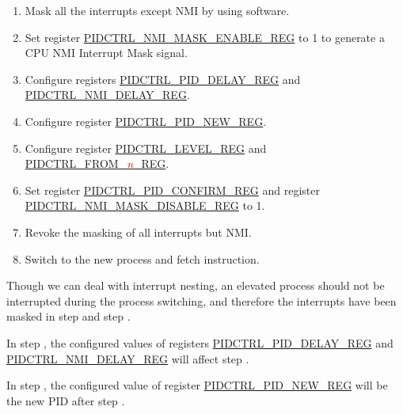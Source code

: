 \documentclass[main\_\_EN.tex]{subfiles}
\begin{document}
\begin{enumerate}
    \item Mask all the interrupts except NMI by using software.
        \setcounter{STEP_MASK_NON_NMI}{\theenumi}
    \item Set register \hyperref[regdesc:PIDCTRLNMIMASKENABLEREG]{PIDCTRL\_NMI\_MASK\_ENABLE\_REG} to 1 to generate a CPU NMI Interrupt Mask signal.
        \setcounter{STEP_MASK_NMI}{\theenumi}
    \item Configure registers \hyperref[regdesc:PIDCTRLPIDDELAYREG]{PIDCTRL\_PID\_DELAY\_REG} and \hyperref[regdesc:PIDCTRLNMIDELAYREG]{PIDCTRL\_NMI\_DELAY\_REG}.
        \setcounter{STEP_SET_DELAY}{\theenumi}
    \item Configure register \hyperref[regdesc:PIDCTRLPIDNEWREG]{PIDCTRL\_PID\_NEW\_REG}.
        \setcounter{STEP_SET_PID_NEW}{\theenumi}
    \item Configure register \hyperref[regdesc:PIDCTRLLEVELREG]{PIDCTRL\_LEVEL\_REG} and \hyperref[regdesc:PIDCTRLFROMnREG]{PIDCTRL\_FROM\_\textcolor{red}{\it{n}}\_REG}.
        \setcounter{STEP_RESTORE}{\theenumi}
    \item Set register \hyperref[regdesc:PIDCTRLPIDCONFIRMREG]{PIDCTRL\_PID\_CONFIRM\_REG} and register \hyperref[regdesc:PIDCTRLNMIMASKDISABLEREG]{PIDCTRL\_NMI\_MASK\_DISABLE\_REG} to 1.
        \setcounter{STEP_CHANGE}{\theenumi}
    \item Revoke the masking of all interrupts but NMI.
        \setcounter{STEP_RELEASE_NON_NMI}{\theenumi}
    \item Switch to the new process and fetch instruction.
        \setcounter{STEP_JUMP}{\theenumi}
\end{enumerate}

Though we can deal with interrupt nesting,
an elevated process should not be interrupted during the process switching, and therefore the interrupts have been masked in step  and step .

In step , the configured values of registers \hyperref[regdesc:PIDCTRLPIDDELAYREG]{PIDCTRL\_PID\_DELAY\_REG} and \hyperref[regdesc:PIDCTRLNMIDELAYREG]{PIDCTRL\_NMI\_DELAY\_REG} will affect step .

In step , the configured value of register
\hyperref[regdesc:PIDCTRLPIDNEWREG]{PIDCTRL\_PID\_NEW\_REG} will be the new PID after step .
\end{document}
